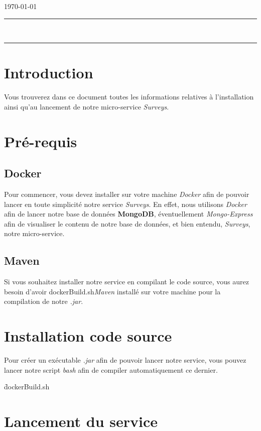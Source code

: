\documentclass[a4paper,11pt]{article}
\author{\auteur}
\title{\titre}
\date{\today}
\begin{document}
	
	\thispagestyle{empty}
	\noindent \cours \hfill \ecole{} \newline
	\noindent \auteur \hfill \today \newline
	\hrule
	\vspace{7mm}
	\noindent {\large \bf \domaine } \hfill \titre {\large \bf }\\[3mm]
	\hrule
	
	\section{Introduction}
	Vous trouverez dans ce document toutes les informations relatives à l'installation ainsi qu'au lancement de notre micro-service \textit{Surveys}. 
	
	\section{Pré-requis}
		\subsection{Docker}
		Pour commencer, vous devez installer sur votre machine \textit{Docker} afin de pouvoir lancer en toute simplicité notre service \textit{Surveys}. En effet, nous utilisons \textit{Docker} afin de lancer notre base de données \textbf{MongoDB}, éventuellement \textit{Mongo-Express} afin de visualiser le contenu de notre base de données, et bien entendu, \textit{Surveys}, notre micro-service.
		
		\subsection{Maven}
		Si vous souhaitez installer notre service en compilant le code source, vous aurez besoin d'avoir dockerBuild.sh\textit{Maven} installé sur votre machine pour la compilation de notre \textit{.jar}.
		
	\section{Installation code source}
		Pour créer un exécutable \textit{.jar} afin de pouvoir lancer notre service, vous pouvez lancer notre script \textit{bash} afin de compiler automatiquement ce dernier.
		
		\f{dockerBuild.sh}
	
	\section{Lancement du service}
\end{document}
